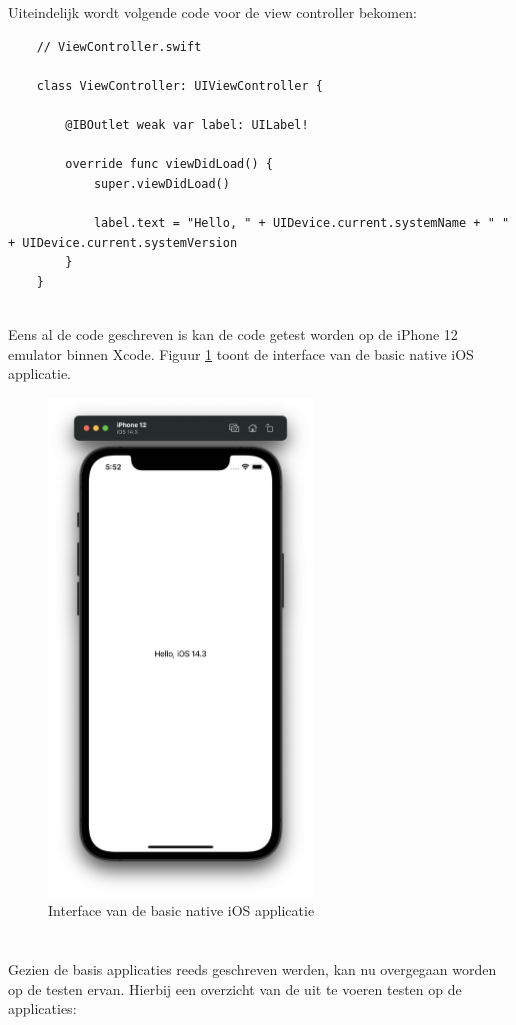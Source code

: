 Uiteindelijk wordt volgende code voor de view controller bekomen: 
\begin{lstlisting}
    // ViewController.swift
    
    class ViewController: UIViewController {
        
        @IBOutlet weak var label: UILabel!
        
        override func viewDidLoad() {
            super.viewDidLoad()
            
            label.text = "Hello, " + UIDevice.current.systemName + " " + UIDevice.current.systemVersion
        }
    }
    
\end{lstlisting}

Eens al de code geschreven is kan de code getest worden op de iPhone 12 emulator binnen Xcode. Figuur \ref{fig:M-basic-ios} toont de interface van de basic native iOS applicatie.

\begin{figure}[H]
    \centering
    \includegraphics[width=7cm]{img/ios-basic.png}
    \caption{Interface van de basic native iOS applicatie}
    \label{fig:M-basic-ios}
\end{figure}

\section{}
\label{sec:M-testing-basic}
Gezien de basis applicaties reeds geschreven werden, kan nu overgegaan worden op de testen ervan. Hierbij een overzicht van de uit te voeren testen op de applicaties:

